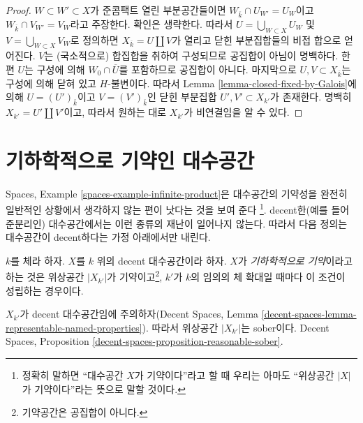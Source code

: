 \begin{proof}
\medskip\noindent
$W \subset W' \subset X$가 준콤팩트 열린 부분공간들이면
$W_{\overline{k}} \cap U_{W'} = U_W$이고
$W_{\overline{k}} \cap V_{W'} = V_W$라고 주장한다. 확인은 생략한다.
따라서 $U = \bigcup_{W \subset X} U_W$ 및
$V = \bigcup_{W \subset X} V_W$로 정의하면
$X_{\overline{k}} = U \amalg V$가 열리고 닫힌 부분집합들의 비접 합으로
얻어진다.
$V$는 (국소적으로) 합집합을 취하여 구성되므로 공집합이 아님이 명백하다.
한편 $U$는 구성에 의해 $W_0 \cap \overline{U}$를 포함하므로 공집합이 아니다.
마지막으로 $U, V \subset X_{\bar k}$는 구성에 의해 닫혀 있고
$H$-불변이다. 따라서 Lemma \ref{lemma-closed-fixed-by-Galois}에 의해
$U = (U')_{\bar k}$이고 $V = (V')_{\bar k}$인 닫힌 부분집합
$U', V' \subset X_{k'}$가 존재한다. 명백히
$X_{k'} = U' \amalg V'$이고, 따라서 원하는 대로 $X_{k'}$가 비연결임을
알 수 있다.
\end{proof}






\section{기하학적으로 기약인 대수공간}
\label{section-geometrically-irreducible}

\noindent
Spaces, Example \ref{spaces-example-infinite-product}은 대수공간의 기약성을
완전히 일반적인 상황에서 생각하지 않는 편이 낫다는 것을 보여 준다
\footnote{정확히 말하면 ``대수공간 $X$가 기약이다''라고 할 때 우리는 아마도
``위상공간 $|X|$가 기약이다''라는 뜻으로 말할 것이다.}. decent한(예를 들어
준분리인) 대수공간에서는 이런 종류의 재난이 일어나지 않는다. 따라서 다음
정의는 대수공간이 decent하다는 가정 아래에서만 내린다.

\begin{definition}
\label{definition-geometrically-irreducible}
$k$를 체라 하자.
$X$를 $k$ 위의 decent 대수공간이라 하자. $X$가
{\it 기하학적으로 기약}이라고 하는 것은 위상공간 $|X_{k'}|$가
기약이고\footnote{기약공간은 공집합이 아니다.}, $k'$가 $k$의 임의의 체
확대일 때마다 이 조건이 성립하는 경우이다.
\end{definition}

\noindent
$X_{k'}$가 decent 대수공간임에 주의하자(Decent Spaces, Lemma
\ref{decent-spaces-lemma-representable-named-properties}). 따라서 위상공간
$|X_{k'}|$는 sober이다. Decent Spaces, Proposition
\ref{decent-spaces-proposition-reasonable-sober}.





